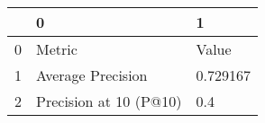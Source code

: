\begin{tabular}{lll}
\toprule
{} &                       0 &         1 \\
\midrule
0 &                  Metric &     Value \\
1 &       Average Precision &  0.729167 \\
2 &  Precision at 10 (P@10) &       0.4 \\
\bottomrule
\end{tabular}
